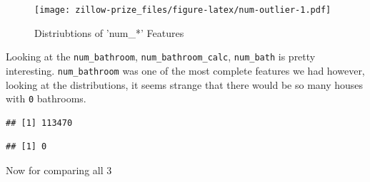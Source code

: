\documentclass[]{book}
\newenvironment{Shaded}{\begin{snugshade}}{\end{snugshade}}
\newcommand{\KeywordTok}[1]{\textcolor[rgb]{0.13,0.29,0.53}{\textbf{#1}}}
\newcommand{\DataTypeTok}[1]{\textcolor[rgb]{0.13,0.29,0.53}{#1}}
\newcommand{\DecValTok}[1]{\textcolor[rgb]{0.00,0.00,0.81}{#1}}
\newcommand{\StringTok}[1]{\textcolor[rgb]{0.31,0.60,0.02}{#1}}
\newcommand{\OtherTok}[1]{\textcolor[rgb]{0.56,0.35,0.01}{#1}}
\newcommand{\OperatorTok}[1]{\textcolor[rgb]{0.81,0.36,0.00}{\textbf{#1}}}
\newcommand{\NormalTok}[1]{#1}
\theoremstyle{definition}
\theoremstyle{definition}
\theoremstyle{definition}
\theoremstyle{remark}
\begin{document}
\begin{figure}
\centering
\texttt{[image: zillow-prize\_files/figure-latex/num-outlier-1.pdf]}
\caption{\label{fig:num-outlier}Distriubtions of 'num\_*' Features}
\end{figure}

Looking at the \texttt{num\_bathroom}, \texttt{num\_bathroom\_calc},
\texttt{num\_bath} is pretty interesting. \texttt{num\_bathroom} was one
of the most complete features we had however, looking at the
distributions, it seems strange that there would be so many houses with
\texttt{0} bathrooms.

\begin{Shaded}
\end{Shaded}

\begin{verbatim}
## [1] 113470
\end{verbatim}

\begin{Shaded}
\end{Shaded}

\begin{verbatim}
## [1] 0
\end{verbatim}

Now for comparing all 3

\begin{Shaded}
\end{Shaded}
\end{document}
